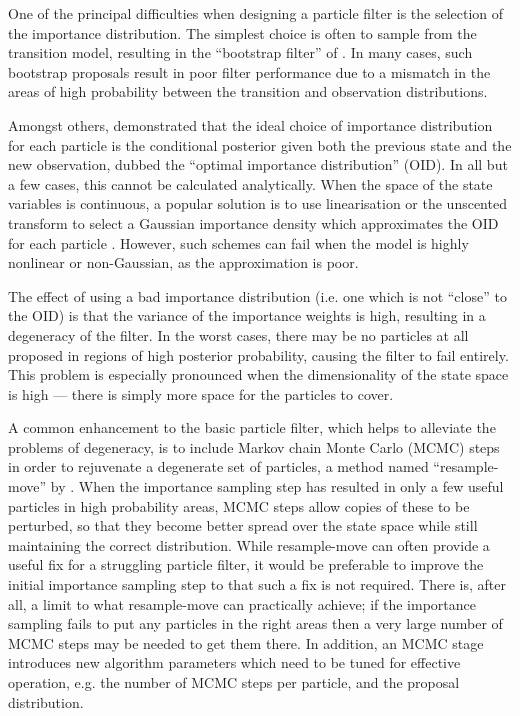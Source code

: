 \documentclass{article}
\begin{document}
One of the principal difficulties when designing a particle filter is the selection of the importance distribution. The simplest choice is often to sample from the transition model, resulting in the ``bootstrap filter'' of \citep{Gordon1993}. In many cases, such bootstrap proposals result in poor filter performance due to a mismatch in the areas of high probability between the transition and observation distributions.

Amongst others, \citet{Doucet2000a} demonstrated that the ideal choice of importance distribution for each particle is the conditional posterior given both the previous state and the new observation, dubbed the ``optimal importance distribution'' (OID). In all but a few cases, this cannot be calculated analytically. When the space of the state variables is continuous, a popular solution is to use linearisation or the unscented transform to select a Gaussian importance density which approximates the OID for each particle \citep{Doucet2000a,Merwe2000}. However, such schemes can fail when the model is highly nonlinear or non-Gaussian, as the approximation is poor.

The effect of using a bad importance distribution (i.e. one which is not ``close'' to the OID) is that the variance of the importance weights is high, resulting in a degeneracy of the filter. In the worst cases, there may be no particles at all proposed in regions of high posterior probability, causing the filter to fail entirely. This problem is especially pronounced when the dimensionality of the state space is high --- there is simply more space for the particles to cover.

A common enhancement to the basic particle filter, which helps to alleviate the problems of degeneracy, is to include Markov chain Monte Carlo (MCMC) steps in order to rejuvenate a degenerate set of particles, a method named ``resample-move'' by \citet{Gilks2001}. When the importance sampling step has resulted in only a few useful particles in high probability areas, MCMC steps allow copies of these to be perturbed, so that they become better spread over the state space while still maintaining the correct distribution. While resample-move can often provide a useful fix for a struggling particle filter, it would be preferable to improve the initial importance sampling step to that such a fix is not required. There is, after all, a limit to what resample-move can practically achieve; if the importance sampling fails to put any particles in the right areas then a very large number of MCMC steps may be needed to get them there. In addition, an MCMC stage introduces new algorithm parameters which need to be tuned for effective operation, e.g. the number of MCMC steps per particle, and the proposal distribution.
\end{document}
